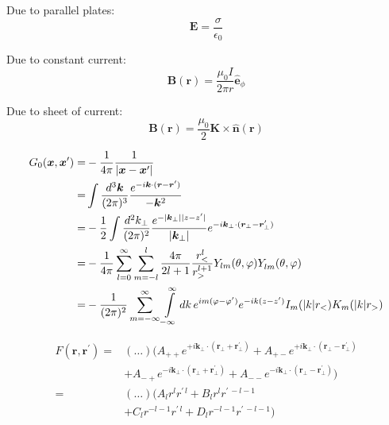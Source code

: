 \documentclass[a4paper, twocolumn]{article}
\renewcommand{\vec}[1]{\boldsymbol{#1}}
\begin{document}
Due to parallel plates:
\begin{equation*}
    \vec{E} = \frac{\sigma}{\epsilon_{0}}
\end{equation*}

Due to constant current:
\begin{equation*}
    \vec{B}(\vec{r}) = \frac{\mu_{0} I}{2 \pi r} \hat{\vec{e}}_{\phi}
\end{equation*}

Due to sheet of current:
\begin{equation*}
    \vec{B}(\vec{r}) = \frac{\mu_{0}}{2} \vec{K} \times \hat{\vec{n}}(\vec{r})
\end{equation*}


\begin{align*}
    G_0(\vec{x}, \vec{x}^{\prime}) =& - \frac{1}{4 \pi} \frac{1}{|\vec{x} - \vec{x}^{\prime}|} \\
                                   =& \int \frac{d^{3} \vec{k}}{(2 \pi)^{3}} \frac{ e^{-i \vec{k} \cdot (\vec{r} - \vec{r}^{\prime})}}{-\vec{k}^{2}} \\
                                   =& -\frac{1}{2} \int \frac{d^{2} k_{\perp}}{(2 \pi)^{2}} \frac{e^{- |\vec{k}_{\perp}| |z - z^{\prime}|}}{|\vec{k}_{\perp}|} e^{-i \vec{k}_{\perp} \cdot (\vec{r}_{\perp} - \vec{r}^{\prime}_{\perp})} \\
                                   =& - \frac{1}{4 \pi} \sum\limits_{l=0}^{\infty} \sum\limits_{m=-l}^{l} \frac{4 \pi}{2l+1} \frac{r_{<}^{l}}{r_{>}^{l+1}} Y_{lm}(\theta, \varphi) Y_{lm}^{\*}(\theta, \varphi) \\
                                   =& -\frac{1}{(2 \pi)^{2}} \sum\limits_{m=-\infty}^{\infty} \int\limits_{-\infty}^{\infty} dk \, e^{im (\varphi - \varphi^{\prime})} e^{-ik(z-z^{\prime})} I_{m}(|k| r_{<}) K_{m}(|k| r_{>})
\end{align*}

\begin{align*}
    F(\vec{r}, \vec{r}^{\prime})
    =& (\dots) (A_{++} e^{+i \vec{k}_{\perp} \cdot ( \vec{r}_{\perp} + \vec{r}_{\perp}^{\prime})} + A_{+-} e^{+i \vec{k}_{\perp} \cdot ( \vec{r}_{\perp} - \vec{r}_{\perp}^{\prime})} \\
     &+ A_{-+} e^{-i \vec{k}_{\perp} \cdot ( \vec{r}_{\perp} + \vec{r}_{\perp}^{\prime})} + A_{--} e^{-i \vec{k}_{\perp} \cdot ( \vec{r}_{\perp} - \vec{r}_{\perp}^{\prime})}) \\
    =& (\dots) (A_{l} r^{l} r^{\prime \, l} + B_{l} r^{l} r^{\prime \, -l-1} \\
     &+ C_{l} r^{-l-1} r^{\prime \, l} + D_{l} r^{-l-1} r^{\prime \, -l-1} ) \\
\end{align*}
\end{document}
